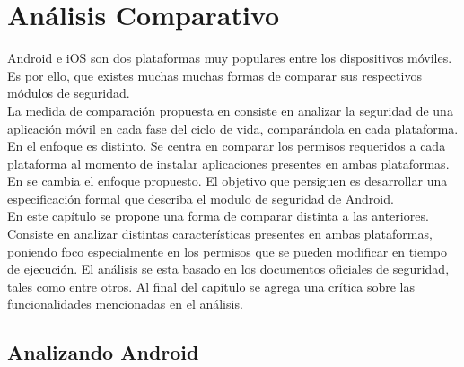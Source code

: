 \chapter{Análisis Comparativo}
Android e iOS son dos plataformas muy populares entre los dispositivos móviles. Es por ello, que existes muchas  muchas formas de comparar sus respectivos módulos de seguridad.\\
La medida de comparación propuesta en \cite{YA2014} consiste en analizar la seguridad de una aplicación móvil en cada fase del ciclo de vida, comparándola en cada plataforma.\\
En \cite{HYGZD2013} el enfoque es distinto. Se centra en comparar los permisos requeridos a cada plataforma al momento de instalar aplicaciones presentes en ambas plataformas.\\
En \cite{Gor16, BCLR15, Rom14} se cambia el enfoque propuesto. El objetivo que persiguen es desarrollar una especificación formal que describa el modulo de seguridad de Android.\\
En este capítulo se propone una forma de comparar distinta a las anteriores. Consiste en analizar distintas características presentes en ambas plataformas, poniendo foco especialmente en los permisos que se pueden modificar en tiempo de ejecución. El análisis se esta basado en los documentos oficiales de seguridad, tales como \cite{aossec, asreview2015, asg} entre otros. Al final del capítulo se agrega una crítica sobre las funcionalidades mencionadas en el análisis.\\
\section{Analizando Android}
